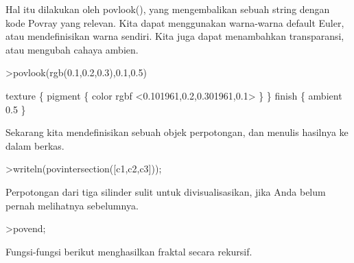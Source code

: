 \documentclass[a4paper,10pt]{article}
\begin{document}
\begin{eulernotebook}
\begin{eulercomment}
\begin{eulercomment}
\begin{eulercomment}
Hal itu dilakukan oleh povlook(), yang mengembalikan sebuah string
dengan kode Povray yang relevan. Kita dapat menggunakan warna-warna
default Euler, atau mendefinisikan warna sendiri. Kita juga dapat
menambahkan transparansi, atau mengubah cahaya ambien.
\end{eulercomment}
\begin{eulerprompt}
>povlook(rgb(0.1,0.2,0.3),0.1,0.5)
\end{eulerprompt}
\begin{euleroutput}
   texture \{ pigment \{ color rgbf <0.101961,0.2,0.301961,0.1> \}  \} 
   finish \{ ambient 0.5 \} 
  
\end{euleroutput}
\begin{eulercomment}
Sekarang kita mendefinisikan sebuah objek perpotongan, dan menulis
hasilnya ke dalam berkas.
\end{eulercomment}
\begin{eulerprompt}
>writeln(povintersection([c1,c2,c3]));
\end{eulerprompt}
\begin{eulercomment}
Perpotongan dari tiga silinder sulit untuk divisualisasikan, jika Anda
belum pernah melihatnya sebelumnya.
\end{eulercomment}
\begin{eulerprompt}
>povend;
\end{eulerprompt}
\begin{eulercomment}
Fungsi-fungsi berikut menghasilkan fraktal secara rekursif.


\end{eulercomment}
\end{eulercomment}
\end{eulercomment}
\end{eulernotebook}
\end{document}
